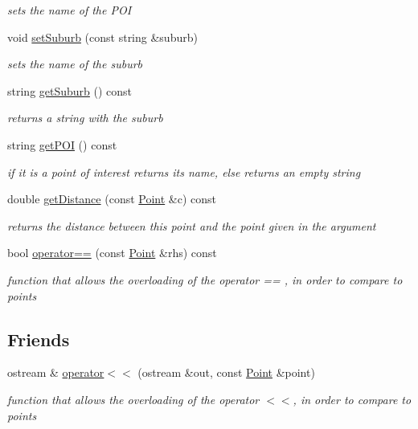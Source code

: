 \begin{DoxyCompactItemize}
\begin{DoxyCompactList}\small\item\em sets the name of the P\+OI \end{DoxyCompactList}\item 
void \hyperlink{class_point_a3b1f65bbe770cd0b3448432b0e351363}{set\+Suburb} (const string \&suburb)\hypertarget{class_point_a3b1f65bbe770cd0b3448432b0e351363}{}\label{class_point_a3b1f65bbe770cd0b3448432b0e351363}

\begin{DoxyCompactList}\small\item\em sets the name of the suburb \end{DoxyCompactList}\item 
string \hyperlink{class_point_afd53cd92f0e22830d9f9055ef37872c9}{get\+Suburb} () const 
\begin{DoxyCompactList}\small\item\em returns a string with the suburb \end{DoxyCompactList}\item 
string \hyperlink{class_point_ae3f1aa6c4314c2c6d628f84da7538547}{get\+P\+OI} () const 
\begin{DoxyCompactList}\small\item\em if it is a point of interest returns its name, else returns an empty string \end{DoxyCompactList}\item 
double \hyperlink{class_point_a71c24131d9fba05674a1295102b0c7a3}{get\+Distance} (const \hyperlink{class_point}{Point} \&c) const 
\begin{DoxyCompactList}\small\item\em returns the distance between this point and the point given in the argument \end{DoxyCompactList}\item 
bool \hyperlink{class_point_a381c5b2ac13d8a3966f5225f94fff6fa}{operator==} (const \hyperlink{class_point}{Point} \&rhs) const 
\begin{DoxyCompactList}\small\item\em function that allows the overloading of the operator == , in order to compare to points \end{DoxyCompactList}\end{DoxyCompactItemize}
\subsection*{Friends}
\begin{DoxyCompactItemize}
\item 
ostream \& \hyperlink{class_point_ab70fc46f0389b8eb1b377d966d144e05}{operator$<$$<$} (ostream \&out, const \hyperlink{class_point}{Point} \&point)
\begin{DoxyCompactList}\small\item\em function that allows the overloading of the operator $<$$<$, in order to compare to points \end{DoxyCompactList}\end{DoxyCompactItemize}


